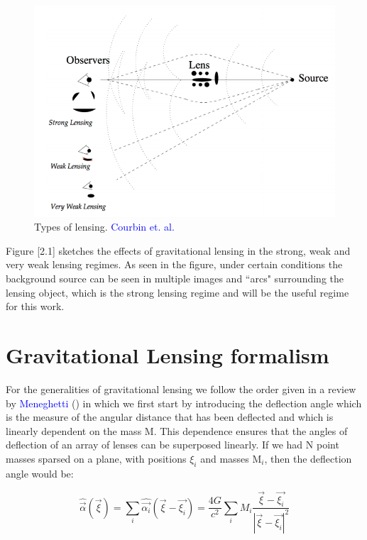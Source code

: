 \begin{figure}[H]
\centering
\includegraphics[width=12cm]{images/types_of_lensing.png}
\caption[Types of lensing]{Types of lensing. \textcolor{blue}{Courbin et. al.} \citeyear{Reference24}}
\end{figure}

Figure [2.1] sketches the effects of gravitational lensing in the strong, weak and very weak lensing regimes. As seen in the figure, under certain conditions the background source can be seen in multiple images and ``arcs" surrounding the lensing object, which is the strong lensing regime and will be the useful regime for this work. 

\section{Gravitational Lensing formalism}

For the generalities of gravitational lensing we follow the order given in a review by \textcolor{blue}{Meneghetti} (\citeyear{Reference26}) in which we first start by introducing the deflection angle which is the measure of the angular distance that has been deflected and which is linearly dependent on the mass $\text{M}$. This dependence ensures that the angles of deflection of an array of lenses can be superposed linearly. If we had N point masses sparsed on a plane, with positions $\xi_i$ and masses $\text{M}_{i}$, then the deflection angle would be:

\begin{equation}
\hat{\vec{\alpha}}(\vec{\xi})=\sum_{i}\hat{\vec{\alpha_{i}}}(\vec{\xi}-\vec{\xi_{i}})=\frac{4G}{c^{2}}\sum_{i}M_{i}\frac{\vec{\xi}-\vec{\xi_{i}}}{\left|\vec{\xi}-\vec{\xi_{i}}\right|^{2}}
\end{equation}

